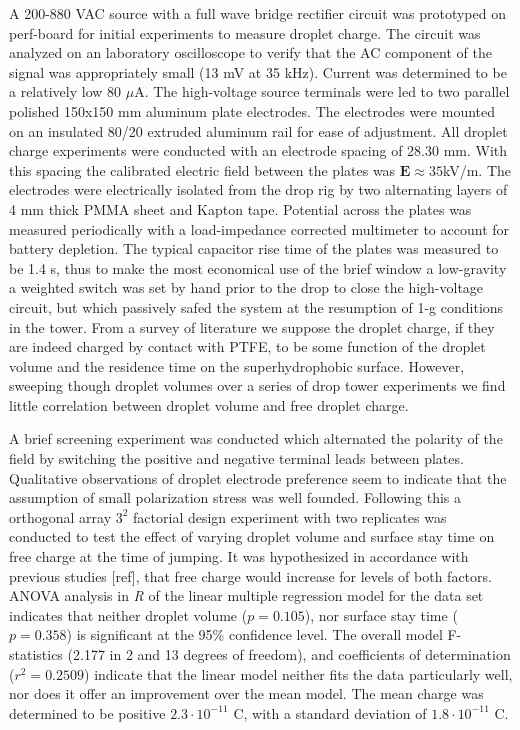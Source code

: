 \documentclass[10pt,a4paper]{article}
\begin{document}
A 200-880 VAC source with a full wave bridge rectifier circuit was prototyped on perf-board for initial experiments to measure droplet charge. The circuit was analyzed on an laboratory oscilloscope to verify that the AC component of the signal was appropriately small (13 mV at 35 kHz). Current was determined to be a relatively low 80 $\mu$A. The high-voltage source terminals were led to two parallel polished 150x150 mm aluminum plate electrodes. The electrodes were mounted on an insulated 80/20 extruded aluminum rail for ease of adjustment. All droplet charge experiments were conducted with an electrode spacing of 28.30 mm. With this spacing the calibrated electric field between the plates was $\mathbf{E} \approx 35$kV/m. The electrodes were electrically isolated from the drop rig by two alternating layers of 4 mm thick PMMA sheet and Kapton tape. Potential across the plates was measured periodically with a load-impedance corrected multimeter to account for battery depletion. The typical capacitor rise time of the plates was measured to be 1.4 s, thus to make the most economical use of the brief window a low-gravity a weighted switch was set by hand prior to the drop to close the high-voltage circuit, but which passively safed the system at the resumption of 1-g conditions in the tower. From a survey of literature we suppose the droplet charge, if they are indeed charged by contact with PTFE, to be some function of the droplet volume and the residence time on the superhydrophobic surface. However, sweeping though droplet volumes over a series of drop tower experiments we find little correlation between droplet volume  and free droplet charge.

A brief screening experiment was conducted which alternated the polarity of the field by switching the positive and negative terminal leads between plates. Qualitative observations of droplet electrode preference seem to indicate that the assumption of small polarization stress was well founded. Following this a orthogonal array $3^2$ factorial design experiment with two replicates was conducted to test the effect of varying droplet volume and surface stay time on free charge at the time of jumping. It was hypothesized in accordance with previous studies [ref], that free charge would increase for levels of both factors. ANOVA analysis in \emph{R} of the linear multiple regression model for the data set indicates that neither droplet volume ($p=0.105$), nor surface stay time ($p=0.358$) is significant at the 95\% confidence level. The overall model F-statistics (2.177 in 2 and 13 degrees of freedom), and coefficients of determination ($r^2 = 0.2509$) indicate that the linear model neither fits the data particularly well, nor does it offer an improvement over the mean model. The mean charge was determined to be positive $2.3 \cdot 10^{-11}$ C, with a standard deviation of $1.8 \cdot 10^{-11}$ C.

\printbibliography
\end{document}
